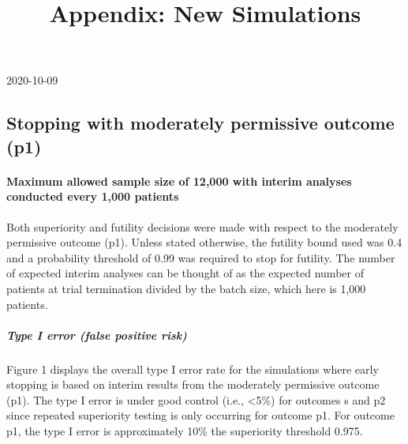 \documentclass[]{article}
\title{Appendix: New Simulations}
\author{}
\date{\vspace{-2.5em}}
\let\oldparagraph\paragraph
\renewcommand{\paragraph}[1]{\oldparagraph{#1}\mbox{}}
\let\oldsubparagraph\subparagraph
\renewcommand{\subparagraph}[1]{\oldsubparagraph{#1}\mbox{}}
\begin{document}
\maketitle

2020-10-09

\hypertarget{stopping-with-moderately-permissive-outcome-p1}{%
\subsection{Stopping with moderately permissive outcome
(p1)}\label{stopping-with-moderately-permissive-outcome-p1}}

\hypertarget{maximum-allowed-sample-size-of-12000-with-interim-analyses-conducted-every-1000-patients}{%
\paragraph{Maximum allowed sample size of 12,000 with interim analyses
conducted every 1,000
patients}\label{maximum-allowed-sample-size-of-12000-with-interim-analyses-conducted-every-1000-patients}}

Both superiority and futility decisions were made with respect to the
moderately permissive outcome (p1). Unless stated otherwise, the
futility bound used was 0.4 and a probability threshold of 0.99 was
required to stop for futility. The number of expected interim analyses
can be thought of as the expected number of patients at trial
termination divided by the batch size, which here is 1,000 patients.

\hypertarget{type-i-error-false-positive-risk}{%
\subparagraph{Type I error (false positive
risk)}\label{type-i-error-false-positive-risk}}

Figure 1 displays the overall type I error rate for the simulations
where early stopping is based on interim results from the moderately
permissive outcome (p1). The type I error is under good control (i.e.,
\textless{}5\%) for outcomes s and p2 since repeated superiority testing
is only occurring for outcome p1. For outcome p1, the type I error is
approximately 10\% the superiority threshold 0.975.

\captionsetup[figure]{font=small,labelfont=small}
\end{document}
